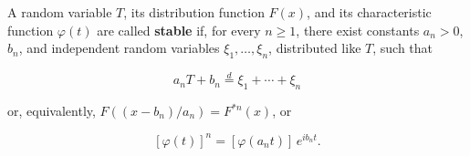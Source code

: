 A random variable $T$, its distribution function $F(x)$, and its characteristic function $\varphi(t)$ are called \textbf{stable} if, for every $n \geq 1$, there exist constants $a_n > 0$, $b_n$, and independent random variables $\xi_1, \ldots, \xi_n$, distributed like $T$, such that

$$a_n T + b_n \stackrel{d}{=} \xi_1 + \cdots + \xi_n$$

or, equivalently, $F((x - b_n)/a_n) = F^{*n}(x)$, or

$$[\varphi(t)]^n = [\varphi(a_n t)] \, e^{i b_n t}.$$
